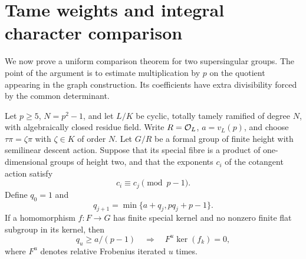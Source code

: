 \section{Tame weights and integral character comparison}\label{sec:formal-comparison}
We now prove a uniform comparison theorem for two supersingular groups. The point of the argument is to estimate multiplication by $p$ on the quotient appearing in the graph construction. Its coefficients have extra divisibility forced by the common determinant.

\begin{lemma}\label{lem:weighted-kernel}
Let $p\ge5$, $N=p^2-1$, and let $L/K$ be cyclic, totally tamely ramified of degree $N$, with algebraically closed residue field. Write $R=\mathcal O_L$, $a=v_L(p)$, and choose $\tau\pi=\zeta\pi$ with $\zeta\in K$ of order $N$. Let $G/R$ be a formal group of finite height with semilinear descent action. Suppose that its special fibre is a product of one-dimensional groups of height two, and that the exponents $c_i$ of the cotangent action satisfy
\[
                         c_i\equiv c_j\pmod{p-1}.
\]
Define $q_0=1$ and
\begin{equation}\label{eq:weighted-recurrence}
                   q_{j+1}=\min\{a+q_j,pq_j+p-1\}.
\end{equation}
If a homomorphism $f:F\to G$ has finite special kernel and no nonzero finite flat subgroup in its kernel, then
\[
 q_u\ge a/(p-1)\quad\Longrightarrow\quad F^u\ker(f_k)=0,
\]
where $F^u$ denotes relative Frobenius iterated $u$ times.
\end{lemma}
